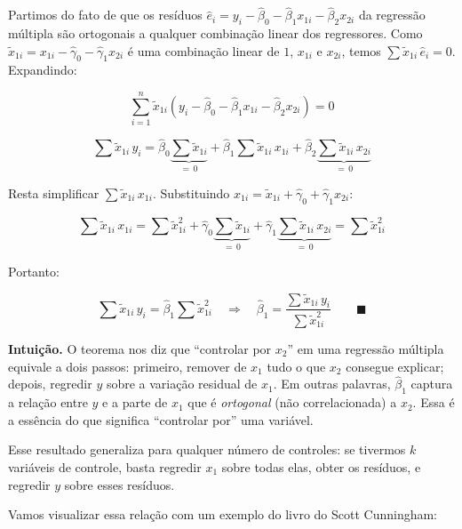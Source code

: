 \documentclass[
]{article}
\begin{document}
Partimos do fato de que os resíduos \(\hat{e}_i = y_i - \hat{\beta}_0 - \hat{\beta}_1 x_{1i} - \hat{\beta}_2 x_{2i}\) da regressão múltipla são ortogonais a qualquer combinação linear dos regressores. Como \(\tilde{x}_{1i} = x_{1i} - \hat{\gamma}_0 - \hat{\gamma}_1 x_{2i}\) é uma combinação linear de \(1\), \(x_{1i}\) e \(x_{2i}\), temos \(\sum \tilde{x}_{1i}\, \hat{e}_i = 0\). Expandindo:

\[\sum_{i=1}^n \tilde{x}_{1i}\left(y_i - \hat{\beta}_0 - \hat{\beta}_1 x_{1i} - \hat{\beta}_2 x_{2i}\right) = 0\]

\[\sum \tilde{x}_{1i}\, y_i = \hat{\beta}_0 \underbrace{\sum \tilde{x}_{1i}}_{=\,0} + \hat{\beta}_1 \sum \tilde{x}_{1i}\, x_{1i} + \hat{\beta}_2 \underbrace{\sum \tilde{x}_{1i}\, x_{2i}}_{=\,0}\]

Resta simplificar \(\sum \tilde{x}_{1i}\, x_{1i}\). Substituindo \(x_{1i} = \tilde{x}_{1i} + \hat{\gamma}_0 + \hat{\gamma}_1 x_{2i}\):

\[\sum \tilde{x}_{1i}\, x_{1i} = \sum \tilde{x}_{1i}^2 + \hat{\gamma}_0 \underbrace{\sum \tilde{x}_{1i}}_{=\,0} + \hat{\gamma}_1 \underbrace{\sum \tilde{x}_{1i}\, x_{2i}}_{=\,0} = \sum \tilde{x}_{1i}^2\]

Portanto:

\[\sum \tilde{x}_{1i}\, y_i = \hat{\beta}_1 \sum \tilde{x}_{1i}^2 \quad \Longrightarrow \quad \hat{\beta}_1 = \frac{\sum \tilde{x}_{1i}\, y_i}{\sum \tilde{x}_{1i}^2} \qquad \blacksquare\]

\textbf{Intuição.} O teorema nos diz que ``controlar por \(x_2\)'' em uma regressão múltipla equivale a dois passos: primeiro, remover de \(x_1\) tudo o que \(x_2\) consegue explicar; depois, regredir \(y\) sobre a variação residual de \(x_1\). Em outras palavras, \(\hat{\beta}_1\) captura a relação entre \(y\) e a parte de \(x_1\) que é \emph{ortogonal} (não correlacionada) a \(x_2\). Essa é a essência do que significa ``controlar por'' uma variável.

Esse resultado generaliza para qualquer número de controles: se tivermos \(k\) variáveis de controle, basta regredir \(x_1\) sobre todas elas, obter os resíduos, e regredir \(y\) sobre esses resíduos.

Vamos visualizar essa relação com um exemplo do livro do Scott Cunningham:
\end{document}
